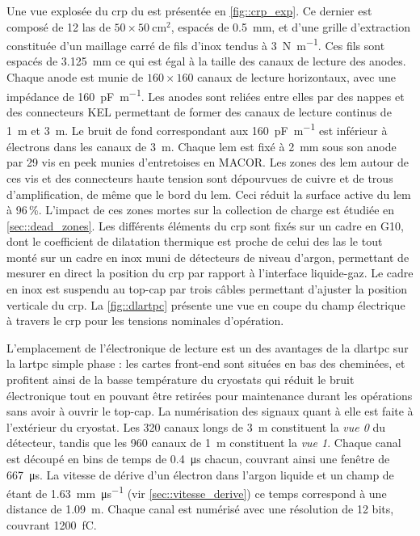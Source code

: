       Une vue explosée du \gls{crp} du \TOO{} est présentée en \autoref{fig::crp_exp}. Ce dernier est composé de 12 \gls{las} de $50\times\SI{50}{\centi\meter\squared}$,  espacés de \SI{0.5}{\milli\meter}, et d'une grille d'extraction constituée d'un maillage carré de fils d'inox tendus à \SI{3}{\newton\per\meter}. Ces fils sont espacés de \SI{3.125}{\milli\meter} ce qui est égal à la taille des canaux de lecture des anodes. Chaque anode est munie de $160\times160$ canaux de lecture horizontaux, avec une impédance de \SI{160}{\pico\farad\per\meter}. Les anodes sont reliées entre elles par des nappes et des connecteurs KEL permettant de former des canaux de lecture continus de \SI{1}{\meter} et \SI{3}{\meter}. Le bruit de fond correspondant aux \SI{160}{\pico\farad\per\meter} est inférieur à  électrons dans les canaux de \SI{3}{\meter}\cite{Aimard2018}. Chaque \gls{lem} est fixé à \SI{2}{\milli\meter} sous son anode par 29 vis en \gls{peek} munies d'entretoises en MACOR. Les zones des \gls{lem} autour de ces vis et des connecteurs haute tension sont dépourvues de cuivre et de trous d'amplification, de même que le bord du \gls{lem}. Ceci réduit la surface active du \gls{lem} à 96\,\%. L'impact de ces zones mortes sur la collection de charge est étudiée en \autoref{sec::dead_zones}. Les différents éléments du \gls{crp} sont fixés sur un cadre en G10, dont le coefficient de dilatation thermique est proche de celui des \gls{las} le tout monté sur un cadre en inox muni de détecteurs de niveau d'argon, permettant de mesurer en direct la position du \gls{crp} par rapport à l'interface liquide-gaz. Le cadre en inox est suspendu au top-cap par trois câbles permettant d'ajuster la position verticale du \gls{crp}. La \autoref{fig::dlartpc} présente une vue en coupe du champ électrique à travers le \gls{crp} pour les tensions nominales d'opération.

      L'emplacement de l'électronique de lecture est un des avantages de la \gls{dlartpc} sur la \gls{lartpc} simple phase : les cartes front-end sont situées en bas des cheminées, et profitent ainsi de la basse température du cryostats qui réduit le bruit électronique tout en pouvant être retirées pour maintenance durant les opérations sans avoir à ouvrir le top-cap. La numérisation des signaux quant à elle est faite à l'extérieur du cryostat. Les 320 canaux longs de \SI{3}{\meter} constituent la \textit{vue 0} du détecteur, tandis que les 960 canaux de \SI{1}{\meter} constituent la \textit{vue 1}. Chaque canal est découpé en  bins de temps de \SI{0.4}{\micro\second} chacun, couvrant ainsi une fenêtre de \SI{667}{\micro\second}. La vitesse de dérive d'un électron dans l'argon liquide et un champ de \driftfield{} étant de \SI{1.63}{\milli\meter\per\micro\second} (vir \autoref{sec::vitesse_derive}) ce temps correspond à une distance de \SI{1.09}{\meter}. Chaque canal est numérisé avec une résolution de 12 bits, couvrant \SI{1200}{\femto\coulomb}.

